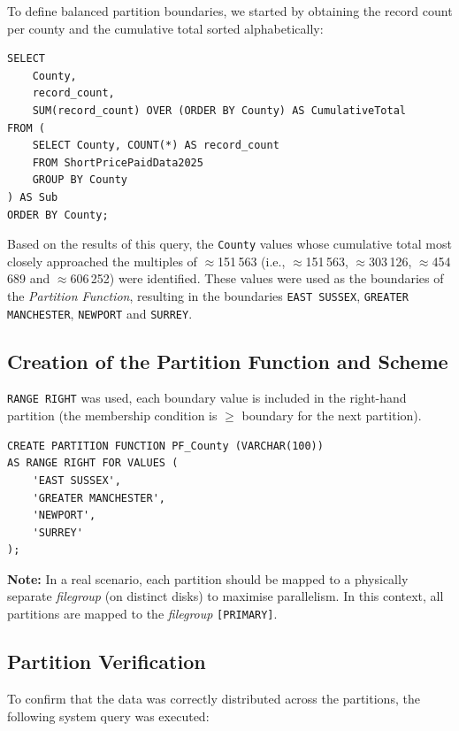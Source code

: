 \documentclass[a4paper,11pt]{article}
\begin{document}
To define balanced partition boundaries, we started by obtaining the record count per county and the cumulative total sorted alphabetically:

\begin{lstlisting}[caption=Record count and cumulative total by County]
SELECT
    County,
    record_count,
    SUM(record_count) OVER (ORDER BY County) AS CumulativeTotal
FROM (
    SELECT County, COUNT(*) AS record_count
    FROM ShortPricePaidData2025
    GROUP BY County
) AS Sub
ORDER BY County;
\end{lstlisting}

Based on the results of this query, the \texttt{County} values whose cumulative total most closely approached the multiples of $\approx$151\,563 (i.e., $\approx$151\,563, $\approx$303\,126, $\approx$454\,689 and $\approx$606\,252) were identified. These values were used as the boundaries of the \textit{Partition Function}, resulting in the boundaries \texttt{EAST SUSSEX}, \texttt{GREATER MANCHESTER}, \texttt{NEWPORT} and \texttt{SURREY}.


\subsection{Creation of the Partition Function and Scheme}

\texttt{RANGE RIGHT} was used, each boundary value is included in the right-hand partition (the membership condition is $\geq$ boundary for the next partition).

\begin{lstlisting}[caption=Partition Function creation with 4 boundaries]
CREATE PARTITION FUNCTION PF_County (VARCHAR(100))
AS RANGE RIGHT FOR VALUES (
    'EAST SUSSEX',
    'GREATER MANCHESTER',
    'NEWPORT',
    'SURREY'
);
\end{lstlisting}

\textbf{Note:} In a real scenario, each partition should be mapped to a physically separate \textit{filegroup} (on distinct disks) to maximise parallelism. In this context, all partitions are mapped to the \textit{filegroup} \texttt{[PRIMARY]}.

\subsection{Partition Verification}

To confirm that the data was correctly distributed across the partitions, the following system query was executed:
\end{document}
